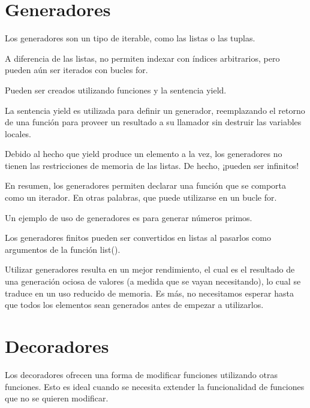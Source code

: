 \documentclass{report}
\begin{document}
\section{Generadores}

Los generadores son un tipo de iterable, como las listas o las tuplas.\smallskip

A diferencia de las listas, no permiten indexar con índices arbitrarios, pero pueden aún ser iterados con bucles for.\smallskip

Pueden ser creados utilizando funciones y la sentencia yield.



La sentencia yield es utilizada para definir un generador, reemplazando el retorno de una función para proveer un resultado a su llamador sin destruir las variables locales.\smallskip

Debido al hecho que yield produce un elemento a la vez, los generadores no tienen las restricciones de memoria de las listas. De hecho, ¡pueden ser infinitos!


En resumen, los generadores permiten declarar una función que se comporta como un iterador. En otras palabras, que puede utilizarse en un bucle for.\smallskip

Un ejemplo de uso de generadores es para generar números primos.


Los generadores finitos pueden ser convertidos en listas al pasarlos como argumentos de la función list().


Utilizar generadores resulta en un mejor rendimiento, el cual es el resultado de una generación ociosa de valores (a medida que se vayan necesitando), lo cual se traduce en un uso reducido de memoria. Es más, no necesitamos esperar hasta que todos los elementos sean generados antes de empezar a utilizarlos.

\section{Decoradores}

Los decoradores ofrecen una forma de modificar funciones utilizando otras funciones. Esto es ideal cuando se necesita extender la funcionalidad de funciones que no se quieren modificar.
\end{document}

